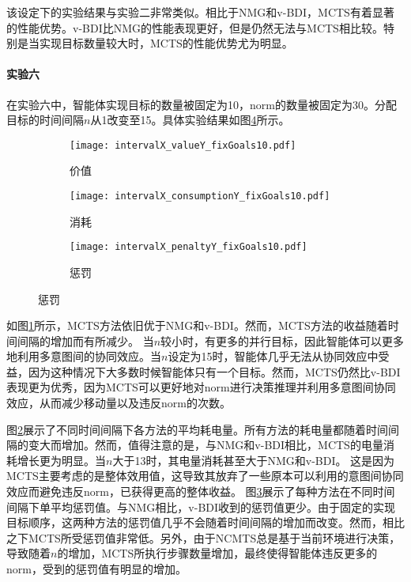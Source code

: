 该设定下的实验结果与实验二非常类似。相比于NMG和v-BDI，MCTS有着显著的性能优势。v-BDI比NMG的性能表现更好，但是仍然无法与MCTS相比较。特别是当实现目标数量较大时，MCTS的性能优势尤为明显。

\paragraph{实验六}
在实验六中，智能体实现目标的数量被固定为10，norm的数量被固定为30。分配目标的时间间隔$n$从1改变至15。具体实验结果如图\ref{fig:all_fixGoals10Norms30}所示。

\begin{figure}
\centering
\begin{subfigure}{.47\textwidth}
\centering
\texttt{[image: intervalX\_valueY\_fixGoals10.pdf]}
\caption{价值}
\captionsetup{justification=centering}
\label{fig:intervalX_valueY_fixGoals10}
\end{subfigure}

\begin{subfigure}{.47\textwidth}
  \centering
  \texttt{[image: intervalX\_consumptionY\_fixGoals10.pdf]}
  \caption{消耗}
  \captionsetup{justification=centering}
  \label{fig:intervalX_consumptionY_fixGoals10}
\end{subfigure}
\begin{subfigure}{.47\textwidth}
  \centering
  \texttt{[image: intervalX\_penaltyY\_fixGoals10.pdf]}
  \caption{惩罚}
  \captionsetup{justification=centering}
  \label{fig:intervalX_penaltyY_fixGoals10}
\end{subfigure}
\captionsetup{justification=centering}
\label{fig:all_fixGoals10Norms30}
\end{figure}
如图\ref{fig:intervalX_valueY_fixGoals10}所示，MCTS方法依旧优于NMG和v-BDI。然而，MCTS方法的收益随着时间间隔的增加而有所减少。
当$n$较小时，有更多的并行目标，因此智能体可以更多地利用多意图间的协同效应。当$n$设定为15时，智能体几乎无法从协同效应中受益，因为这种情况下大多数时候智能体只有一个目标。然而，MCTS仍然比v-BDI表现更为优秀，因为MCTS可以更好地对norm进行决策推理并利用多意图间协同效应，从而减少移动量以及违反norm的次数。

图\ref{fig:intervalX_consumptionY_fixGoals10}展示了不同时间间隔下各方法的平均耗电量。所有方法的耗电量都随着时间间隔的变大而增加。然而，值得注意的是，与NMG和v-BDI相比，MCTS的电量消耗增长更为明显。当$n$大于13时，其电量消耗甚至大于NMG和v-BDI。
这是因为MCTS主要考虑的是整体效用值，这导致其放弃了一些原本可以利用的意图间协同效应而避免违反norm，已获得更高的整体收益。
图\ref{fig:intervalX_penaltyY_fixGoals10}展示了每种方法在不同时间间隔下单平均惩罚值。与NMG相比，v-BDI收到的惩罚值更少。由于固定的实现目标顺序，这两种方法的惩罚值几乎不会随着时间间隔的增加而改变。然而，相比之下MCTS所受惩罚值非常低。另外，由于NCMTS总是基于当前环境进行决策，导致随着$n$的增加，MCTS所执行步骤数量增加，最终使得智能体违反更多的norm，受到的惩罚值有明显的增加。
